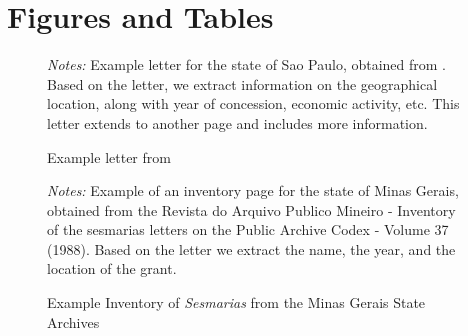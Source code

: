\documentclass[11pt]{article}
\begin{document}
\renewcommand{\thefigure}{A.\arabic{figure}}
\renewcommand{\thetable}{A.\arabic{table}}

\section{Figures and Tables}

\begin{figure}[h!]
  \begin{center}
  \caption{Example letter from \textcite{noauthor_1921-qd}}
  \label{fig:example_letter_sp}
  \vspace{3mm}
  \end{center}
  \textit{Notes:} Example letter for the state of Sao Paulo, obtained from \textcite[p.~47]{noauthor_1921-qd}. 
  Based on the letter, we extract information on the geographical location, along with year of concession, economic activity, etc. 
  This letter extends to another page and includes more information.
\end{figure}

\begin{landscape}
  \begin{figure}[htbp]
    \begin{center}
      \caption{Example Inventory of \textit{Sesmarias} from the Minas Gerais State Archives}
      \label{fig:example_letter_mg}
      \vspace{3mm}
      \end{center}
      \textit{Notes:} Example of an inventory page for the state of Minas Gerais, obtained from   the Revista do Arquivo Publico Mineiro - Inventory of the sesmarias letters on the Public Archive Codex - Volume 37 (1988). Based on the letter we extract the name, the year, and the location of the grant.
  \end{figure}
  \end{landscape}

\clearpage
\end{document}
